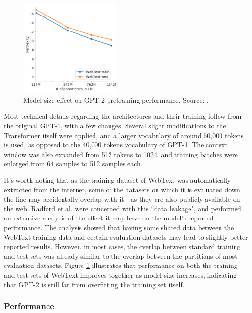 \documentclass{article}
\begin{document}
\begin{figure}
    \centering
    \vspace{-2mm}
    \includegraphics[width=0.45\textwidth]{figures/gpt2_fig4.png}
    \caption{
        Model size effect on GPT-2 pretraining performance. Source: \citet{radford2019gpt2}.
    }
    \label{fig:gpt2_fig4}
    \vspace{-4mm}
\end{figure}

\medskip
\noindent
Most technical details regarding the architectures and their training follow from the original GPT-1, with a few changes. Several slight modifications to the Transformer itself were applied, and a larger vocabulary of around 50,000 tokens is used, as opposed to the 40,000 tokens vocabulary of GPT-1. The context window was also expanded from 512 tokens to 1024, and training batches were enlarged from 64 samples to 512 samples each.

\medskip
\noindent
It's worth noting that as the training dataset of WebText was automatically extracted from the internet, some of the datasets on which it is evaluated down the line may accidentally overlap with it - as they are also publicly available on the web. Radford et al. were concerned with this ``data leakage", and performed an extensive analysis of the effect it may have on the model's reported performance. The analysis showed that having some shared data between the WebText training data and certain evaluation datasets may lead to slightly better reported results. However, in most cases, the overlap between standard training and test sets was already similar to the overlap between the partitions of most evaluation datasets. Figure \ref{fig:gpt2_fig4} illustrates that performance on both the training and test sets of WebText improves together as model size increases, indicating that GPT-2 is still far from overfitting the training set itself.


\subsubsection{Performance}
\label{subsec:gpt2-perform}
\end{document}
